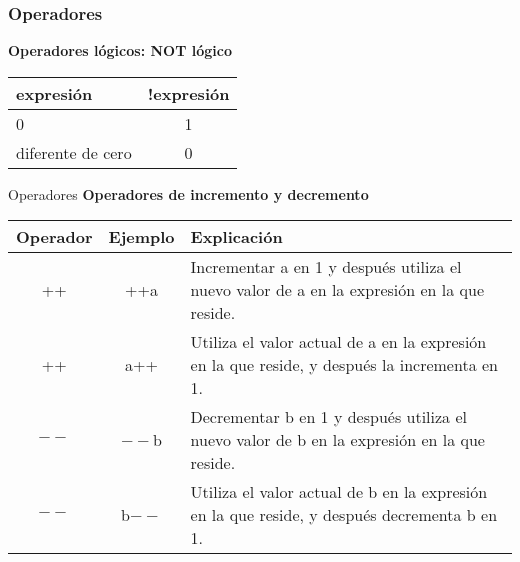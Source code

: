 \begin{frame}[t]
\frametitle{Operadores}
\textbf{Operadores lógicos: NOT lógico}\\ \vspace{5mm}
\centering
\begin{tabular}{lc}
\toprule
\textbf{expresión} & \textbf{!expresión}\\
\midrule \hline
0 & 1 \\
diferente de cero & 0\\
\bottomrule
\end{tabular}
\end{frame}

\begin{frame}[t]{Operadores}
\textbf{Operadores de incremento y decremento}\\ \vspace{5mm}
\footnotesize
\begin{center}
\begin{tabular}{ccp{7.5cm}}
	\toprule
	\textbf{Operador} & \textbf{Ejemplo} & \textbf{Explicación}\\
	\midrule
	++&++a& Incrementar a en 1 y después utiliza el nuevo valor de a en la expresión en la que reside.\\
	++ & a++ & Utiliza el valor actual de a en la expresión en la que reside, y después la incrementa en 1.\\
	$--$ & $--$b & Decrementar b en 1 y despu\'es utiliza el nuevo valor de b en la expresión en la que reside.\\
	$--$ & b$--$ & Utiliza el valor actual de b en la expresión en la que reside, y después decrementa b en 1.\\
	\bottomrule
\end{tabular}
\end{center}
\end{frame}


